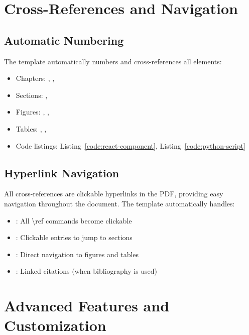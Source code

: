 \documentclass{internshipreport}
\begin{document}
\chapter{Cross-References and Navigation}
\label{chap:references}

\section{Automatic Numbering}

The template automatically numbers and cross-references all elements:

\begin{itemize}
\item Chapters: , , 
\item Sections: , 
\item Figures: , , 
\item Tables: , , 
\item Code listings: Listing~\ref{code:react-component}, Listing~\ref{code:python-script}
\end{itemize}

\section{Hyperlink Navigation}

All cross-references are clickable hyperlinks in the PDF, providing easy navigation throughout the document. The template automatically handles:

\begin{itemize}
\item {}: All \textbackslash ref commands become clickable
\item {}: Clickable entries to jump to sections
\item {}: Direct navigation to figures and tables
\item {}: Linked citations (when bibliography is used)
\end{itemize}

\chapter{Advanced Features and Customization}
\label{chap:advanced}
\end{document}
